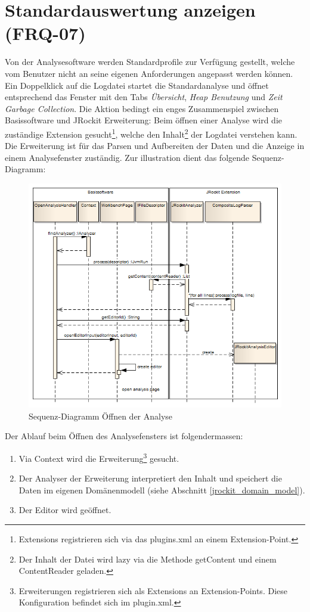 \section{Standardauswertung anzeigen (FRQ-07)}
Von der Analysesoftware werden Standardprofile zur Verfügung gestellt, welche vom Benutzer nicht an seine eigenen Anforderungen angepasst werden können. Ein Doppelklick auf die Logdatei startet die Standardanalyse und öffnet entsprechend das Fenster mit den Tabs \textit{Übersicht}, \textit{Heap Benutzung} und \textit{Zeit Garbage Collection}. Die Aktion bedingt ein enges Zusammenspiel zwischen Basissoftware und JRockit Erweiterung: Beim öffnen einer Analyse wird die zuständige Extension gesucht\footnote{Extensions registrieren sich via das plugins.xml an einem Extension-Point. }, welche den Inhalt\footnote{Der Inhalt der Datei wird lazy via die Methode getContent und einem ContentReader geladen.} der Logdatei verstehen kann. Die Erweiterung ist für das Parsen und Aufbereiten der Daten und die Anzeige in einem Analysefenster zuständig. Zur illustration dient das folgende Sequenz-Diagramm:
 \begin{figure}[H]
  	\centering
    	\includegraphics[width=16cm]{images/core_sequence_analysis}
	\caption{Sequenz-Diagramm Öffnen der Analyse}
\end{figure}
Der Ablauf beim Öffnen des Analysefensters ist folgendermassen:
\begin{enumerate}
	\item Via Context wird die Erweiterung\footnote{Erweiterungen registrieren sich als Extensions an Extension-Points. Diese Konfiguration befindet sich im plugin.xml.} gesucht.
	\item Der Analyser der Erweiterung interpretiert den Inhalt und speichert die Daten im eigenen Domänenmodell (siehe Abschnitt \ref{jrockit_domain_model}).
	\item Der Editor wird geöffnet.
\end{enumerate}


